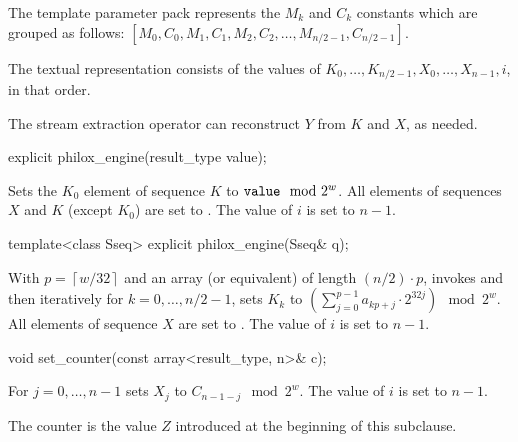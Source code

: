 \pnum
The template parameter pack  represents
the $M_k$ and $C_k$ constants which are grouped as follows:
$[ M_0, C_0, M_1, C_1, M_2, C_2, \dotsc, M_{n/2 - 1}, C_{n/2 - 1} ]$.

\pnum
The textual representation consists of the values of
$K_0, \dotsc, K_{n/2 - 1}, X_{0}, \dotsc, X_{n - 1}, i$, in that order.
\begin{note}
The stream extraction operator can reconstruct $Y$ from $K$ and $X$, as needed.
\end{note}

\begin{itemdecl}
explicit philox_engine(result_type value);
\end{itemdecl}

\begin{itemdescr}
\pnum
\effects
Sets the $K_0$ element of sequence $K$ to $\texttt{\protect value} \mod 2^w$.
All elements of sequences $X$ and $K$ (except $K_0$) are set to .
The value of $i$ is set to $n - 1$.
\end{itemdescr}

\begin{itemdecl}
template<class Sseq> explicit philox_engine(Sseq& q);
\end{itemdecl}

\begin{itemdescr}
\pnum
\effects
With $p = \left\lceil w / 32 \right\rceil$ and
an array (or equivalent)  of length $(n/2) \cdot p$,
invokes  and
then iteratively for $k = 0, \dotsc, n/2 - 1$,
sets $K_k$ to
$\left(\sum_{j = 0}^{p - 1} a_{k p + j} \cdot 2^{32j} \right) \mod 2^w$.
All elements of sequence $X$ are set to .
The value of $i$ is set to $n - 1$.
\end{itemdescr}

%
\begin{itemdecl}
void set_counter(const array<result_type, n>& c);
\end{itemdecl}

\begin{itemdescr}
\pnum
\effects
For $j = 0, \dotsc, n - 1$ sets $X_j$ to $C_{n - 1 - j} \mod 2^w$.
The value of $i$ is set to $n - 1$.
\begin{note}
The counter is the value $Z$ introduced at the beginning of this subclause.
\end{note}
\end{itemdescr}

